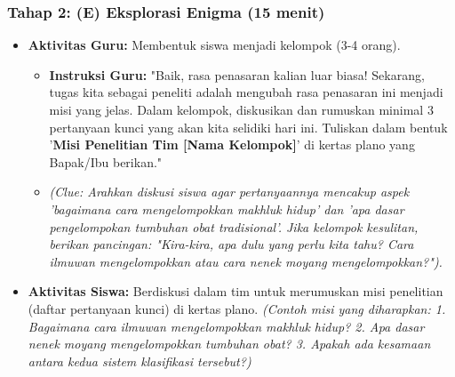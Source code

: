 \documentclass[a4paper,12pt]{article}
\begin{document}
\subsubsection{Tahap 2: (E) Eksplorasi Enigma (15 menit)}
\begin{itemize}
\item \textbf{Aktivitas Guru:} Membentuk siswa menjadi kelompok (3-4 orang).
    \begin{itemize}
    \item \textbf{Instruksi Guru:} "Baik, rasa penasaran kalian luar biasa! Sekarang, tugas kita sebagai peneliti adalah mengubah rasa penasaran ini menjadi misi yang jelas. Dalam kelompok, diskusikan dan rumuskan minimal 3 pertanyaan kunci yang akan kita selidiki hari ini. Tuliskan dalam bentuk '\textbf{Misi Penelitian Tim [Nama Kelompok]}' di kertas plano yang Bapak/Ibu berikan."
    \item \textit{(Clue: Arahkan diskusi siswa agar pertanyaannya mencakup aspek 'bagaimana cara mengelompokkan makhluk hidup' dan 'apa dasar pengelompokan tumbuhan obat tradisional'. Jika kelompok kesulitan, berikan pancingan: "Kira-kira, apa dulu yang perlu kita tahu? Cara ilmuwan mengelompokkan atau cara nenek moyang mengelompokkan?").}
    \end{itemize}
\item \textbf{Aktivitas Siswa:} Berdiskusi dalam tim untuk merumuskan misi penelitian (daftar pertanyaan kunci) di kertas plano. \textit{(Contoh misi yang diharapkan: 1. Bagaimana cara ilmuwan mengelompokkan makhluk hidup? 2. Apa dasar nenek moyang mengelompokkan tumbuhan obat? 3. Apakah ada kesamaan antara kedua sistem klasifikasi tersebut?)}
\end{itemize}
\end{document}
